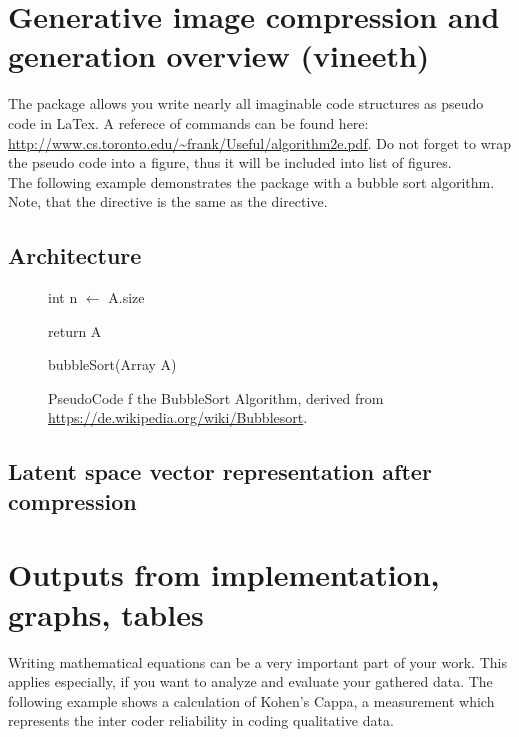 \section{Generative image compression and generation overview (vineeth)}


The package  allows you write nearly all imaginable code structures as pseudo code in LaTex. A referece of commands can be found here: \url{http://www.cs.toronto.edu/~frank/Useful/algorithm2e.pdf}. Do not forget to wrap the pseudo code into a figure, thus it will be included into list of figures.\\

The following example demonstrates the package with a bubble sort algorithm. Note, that the directive  is the same as the  directive.

\subsection{Architecture}

\begin{figure}[H]
\begin{algorithm}[H]

int n $\leftarrow$ A.size 



return A
\caption{bubbleSort(Array A)}
\end{algorithm}
\caption[BubbleSort Algorithm Pseudocoe]{PseudoCode f the BubbleSort Algorithm, derived from \url{https://de.wikipedia.org/wiki/Bubblesort}.}
\end{figure}

\subsection{Latent space vector representation after compression}

\newpage
\section{Outputs from implementation, graphs, tables}

Writing mathematical equations can be a very important part of your work. This applies especially, if you want to analyze and evaluate your gathered data. The following example shows a calculation of Kohen's Cappa, a measurement which represents the inter coder reliability in coding qualitative data.\\

